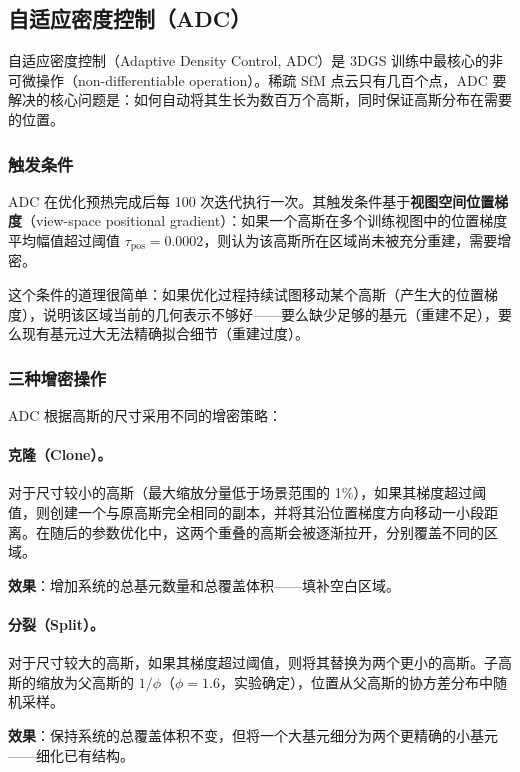 \subsection{自适应密度控制（ADC）}
\label{sec:01_1_4}

自适应密度控制（Adaptive Density Control, ADC）是 3DGS 训练中最核心的非可微操作（non-differentiable operation）。稀疏 SfM 点云只有几百个点，ADC 要解决的核心问题是：如何自动将其生长为数百万个高斯，同时保证高斯分布在需要的位置。

\subsubsection{触发条件}

ADC 在优化预热完成后每 100 次迭代执行一次。其触发条件基于\textbf{视图空间位置梯度}（view-space positional gradient）：如果一个高斯在多个训练视图中的位置梯度平均幅值超过阈值 $\tau_{\mathrm{pos}} = 0.0002$，则认为该高斯所在区域尚未被充分重建，需要增密。

这个条件的道理很简单：如果优化过程持续试图移动某个高斯（产生大的位置梯度），说明该区域当前的几何表示不够好——要么缺少足够的基元（重建不足），要么现有基元过大无法精确拟合细节（重建过度）。

\subsubsection{三种增密操作}

ADC 根据高斯的尺寸采用不同的增密策略：

\paragraph{克隆（Clone）。} 对于尺寸较小的高斯（最大缩放分量低于场景范围的 1\%），如果其梯度超过阈值，则创建一个与原高斯完全相同的副本，并将其沿位置梯度方向移动一小段距离。在随后的参数优化中，这两个重叠的高斯会被逐渐拉开，分别覆盖不同的区域。

\textbf{效果}：增加系统的总基元数量和总覆盖体积——填补空白区域。

\paragraph{分裂（Split）。} 对于尺寸较大的高斯，如果其梯度超过阈值，则将其替换为两个更小的高斯。子高斯的缩放为父高斯的 $1/\phi$（$\phi = 1.6$，实验确定），位置从父高斯的协方差分布中随机采样。

\textbf{效果}：保持系统的总覆盖体积不变，但将一个大基元细分为两个更精确的小基元——细化已有结构。


